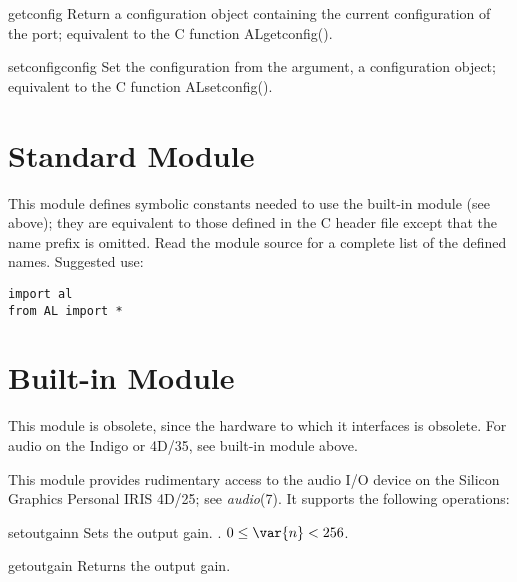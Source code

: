 \begin{funcdesc}{getconfig}{}
Return a configuration object containing the current configuration of
the port; equivalent to the C function ALgetconfig().
\end{funcdesc}

\begin{funcdesc}{setconfig}{config}
Set the configuration from the argument, a configuration object;
equivalent to the C function ALsetconfig().
\end{funcdesc}

\section{Standard Module }

This module defines symbolic constants needed to use the built-in
module  (see above); they are equivalent to those defined in
the C header file  except that the name prefix
 is omitted.  Read the module source for a complete list of
the defined names.  Suggested use:

\bcode\begin{verbatim}
import al
from AL import *
\end{verbatim}\ecode

\section{Built-in Module }

 This module is obsolete, since the hardware to which it
interfaces is obsolete.  For audio on the Indigo or 4D/35, see
built-in module  above.

This module provides rudimentary access to the audio I/O device
 on the Silicon Graphics Personal IRIS 4D/25;
see {\it audio}(7). It supports the following operations:

\renewcommand{\indexsubitem}{(in module audio)}
\begin{funcdesc}{setoutgain}{n}
Sets the output gain.
\iftexi
{}.
\else
$0 \leq \var{n} < 256$.
\fi
\end{funcdesc}

\begin{funcdesc}{getoutgain}{}
Returns the output gain.
\end{funcdesc}


